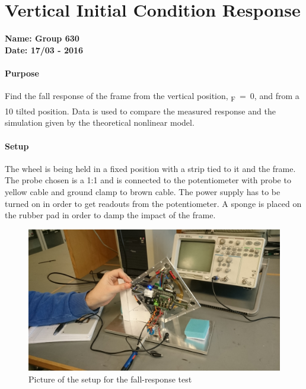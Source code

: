 \chapter{Vertical Initial Condition Response}\label{fallResponseAppendix} 
\textbf{Name: Group 630}\\
\textbf{Date: 17/03 - 2016}

\subsubsection{Purpose}
Find the fall response of the frame from the vertical position, \si{\theta_F=0}, and from a \si{10^\circ} tilted position.
Data is used to compare the measured response and the simulation given by the theoretical nonlinear model.


\subsubsection{Setup}
The wheel is being held in a fixed position with a strip tied to it and the frame. The probe chosen is a 1:1 and is connected to the potentiometer with probe to yellow cable and ground clamp to brown cable. The power supply has to be turned on in order to get readouts from the potentiometer. A sponge is placed on the rubber pad in order to damp the impact of the frame.
\begin{figure}[H]                                   
	\centering                                        
	\includegraphics[scale=0.08]{figures/stepResponseSetup}
	\caption{Picture of the setup for the fall-response test}
	\label{stepResponseTestPicture} 
\end{figure}              

